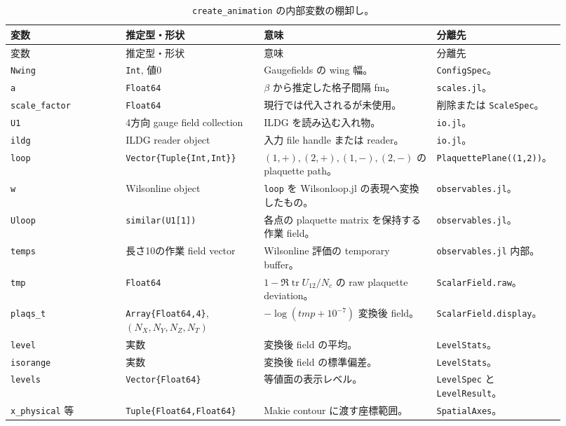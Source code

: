 \documentclass[uplatex,dvipdfmx,ja=standard,11pt,a4paper]{bxjsarticle}
\newcommand{\tr}{\operatorname{tr}}
\newcommand{\code}[1]{\texttt{#1}}
\begin{document}
{\small
\begin{longtable}{p{0.20\linewidth}p{0.24\linewidth}p{0.30\linewidth}p{0.18\linewidth}}
\caption{\code{create\_animation} の内部変数の棚卸し。}\label{tab:create-vars}\\
\toprule
変数 & 推定型・形状 & 意味 & 分離先 \\
\midrule
\endfirsthead
\toprule
変数 & 推定型・形状 & 意味 & 分離先 \\
\midrule
\endhead
\code{Nwing} & \code{Int}, 値0 & Gaugefields の wing 幅。 & \code{ConfigSpec}。 \\
\code{a} & \code{Float64} & \(\beta\) から推定した格子間隔 fm。 & \code{scales.jl}。 \\
\code{scale\_factor} & \code{Float64} & 現行では代入されるが未使用。 & 削除または \code{ScaleSpec}。 \\
\code{U1} & 4方向 gauge field collection & ILDG を読み込む入れ物。 & \code{io.jl}。 \\
\code{ildg} & ILDG reader object & 入力 file handle または reader。 & \code{io.jl}。 \\
\code{loop} & \code{Vector\{Tuple\{Int,Int\}\}} & \((1,+),(2,+),(1,-),(2,-)\) の plaquette path。 & \code{PlaquettePlane((1,2))}。 \\
\code{w} & Wilsonline object & \code{loop} を Wilsonloop.jl の表現へ変換したもの。 & \code{observables.jl}。 \\
\code{Uloop} & \code{similar(U1[1])} & 各点の plaquette matrix を保持する作業 field。 & \code{observables.jl}。 \\
\code{temps} & 長さ10の作業 field vector & Wilsonline 評価の temporary buffer。 & \code{observables.jl} 内部。 \\
\code{tmp} & \code{Float64} & \(1-\Re\tr U_{12}/N_c\) の raw plaquette deviation。 & \code{ScalarField.raw}。 \\
\code{plaqs\_t} & \code{Array\{Float64,4\}}, \((N_X,N_Y,N_Z,N_T)\) & \(-\log(tmp+10^{-7})\) 変換後 field。 & \code{ScalarField.display}。 \\
\code{level} & 実数 & 変換後 field の平均。 & \code{LevelStats}。 \\
\code{isorange} & 実数 & 変換後 field の標準偏差。 & \code{LevelStats}。 \\
\code{levels} & \code{Vector\{Float64\}} & 等値面の表示レベル。 & \code{LevelSpec} と \code{LevelResult}。 \\
\code{x\_physical} 等 & \code{Tuple\{Float64,Float64\}} & Makie contour に渡す座標範囲。 & \code{SpatialAxes}。 \\

\end{longtable}}
\end{document}

